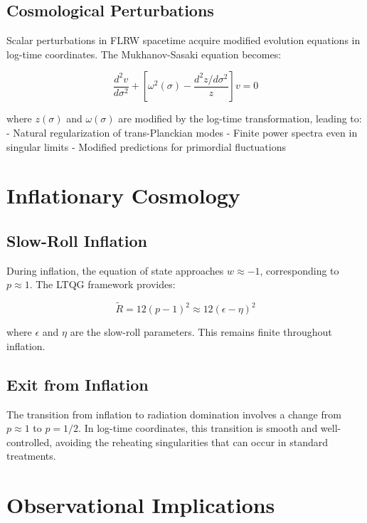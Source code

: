 \documentclass[11pt,a4paper]{article}
\begin{document}
\subsection{Cosmological Perturbations}

Scalar perturbations in FLRW spacetime acquire modified evolution equations in log-time coordinates. The Mukhanov-Sasaki equation becomes:

\begin{equation}
\frac{d^2 v}{d\sigma^2} + \left[\omega^2(\sigma) - \frac{d^2 z/d\sigma^2}{z}\right] v = 0
\end{equation}

where $z(\sigma)$ and $\omega(\sigma)$ are modified by the log-time transformation, leading to:
- Natural regularization of trans-Planckian modes
- Finite power spectra even in singular limits
- Modified predictions for primordial fluctuations

\section{Inflationary Cosmology}

\subsection{Slow-Roll Inflation}

During inflation, the equation of state approaches $w \approx -1$, corresponding to $p \approx 1$. The LTQG framework provides:

\begin{equation}
\tilde{R} = 12(p-1)^2 \approx 12(\epsilon - \eta)^2
\end{equation}

where $\epsilon$ and $\eta$ are the slow-roll parameters. This remains finite throughout inflation.

\subsection{Exit from Inflation}

The transition from inflation to radiation domination involves a change from $p \approx 1$ to $p = 1/2$. In log-time coordinates, this transition is smooth and well-controlled, avoiding the reheating singularities that can occur in standard treatments.

\section{Observational Implications}
\end{document}
